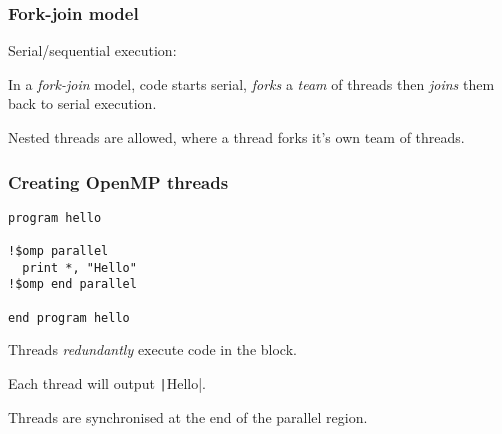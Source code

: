 \documentclass{beamer}
\begin{document}
\begin{frame}
\frametitle{Fork-join model}
Serial/sequential execution:
\begin{center}
\end{center}

In a \emph{fork-join} model, code starts serial, \emph{forks} a \emph{team} of threads then \emph{joins} them back to serial execution.
\begin{center}
\end{center}

Nested threads are allowed, where a thread forks it's own team of threads.
\end{frame}

\begin{frame}[fragile]
\frametitle{Creating OpenMP threads}
\begin{verbatim}
program hello

!$omp parallel
  print *, "Hello"
!$omp end parallel

end program hello
\end{verbatim}

Threads \emph{redundantly} execute code in the block.

Each thread will output \texttt|Hello|.

Threads are synchronised at the end of the parallel region.

\end{frame}
\end{document}
